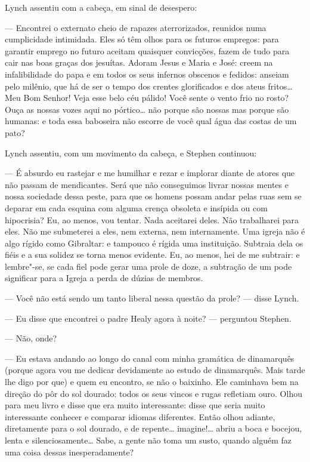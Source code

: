 Lynch assentiu com a cabeça, em sinal de desespero:

--- Encontrei o externato cheio de rapazes aterrorizados,
reunidos numa cumplicidade intimidada.  Eles só têm olhos para os
futuros empregos: para garantir emprego no futuro aceitam quaisquer
convicções, fazem de tudo para cair nas boas graças dos jesuítas. 
Adoram Jesus e Maria e José: creem na \label{infalibilidade} infalibilidade do papa e em
todos os seus infernos obscenos e fedidos: anseiam pelo milênio, que há
de ser o tempo dos crentes glorificados e dos ateus fritos\ldots{}  Meu Bom
Senhor!  Veja esse belo céu pálido!  Você sente o vento frio no rosto? 
Ouça as nossas vozes aqui no pórtico\ldots{} não porque
são nossas mas porque são humanas: e toda essa baboseira não escorre de
você qual água das costas de um pato?

Lynch assentiu, com um movimento da cabeça, e Stephen continuou:

--- É absurdo eu rastejar e me humilhar e rezar e implorar diante
de atores que não passam de mendicantes.  Será que não conseguimos
livrar nossas mentes e nossa sociedade dessa peste, para que os homens
possam andar pelas ruas sem se deparar em cada esquina com alguma
crença obsoleta e insípida ou com hipocrisia?  Eu, ao menos, vou
tentar.  Nada aceitarei deles.  Não trabalharei para eles.  Não me
submeterei a eles, nem externa, nem internamente.  Uma igreja não é
algo rígido como Gibraltar: e tampouco é rígida uma instituição. 
Subtraia dela os fiéis e a sua solidez se torna menos evidente.  Eu, ao
menos, hei de me subtrair: e lembre"-se, se cada fiel pode gerar uma
prole de doze, a subtração de um pode significar para a Igreja a perda
de dúzias de membros.

--- Você não está sendo um tanto liberal nessa questão da prole?
--- disse Lynch.

--- Eu disse que encontrei o padre Healy agora à noite? ---
perguntou Stephen.

--- Não, onde?

--- Eu estava andando ao longo do canal com minha gramática de
dinamarquês (porque agora vou me dedicar devidamente ao estudo de
dinamarquês.  Mais tarde lhe digo por que) e quem eu encontro, se não o
baixinho.  Ele caminhava bem na direção do \label{por"-do} pôr do sol dourado: todos
os seus vincos e rugas refletiam ouro.  Olhou para meu livro e disse
que era muito interessante: disse que seria muito interessante conhecer
e comparar idiomas diferentes.  Então olhou adiante, diretamente para o
sol dourado, e de repente\ldots{} imagine!\ldots{} abriu a boca e bocejou, lenta
e silenciosamente\ldots{}  Sabe, a gente não toma um susto, quando alguém
faz uma coisa dessas inesperadamente?

